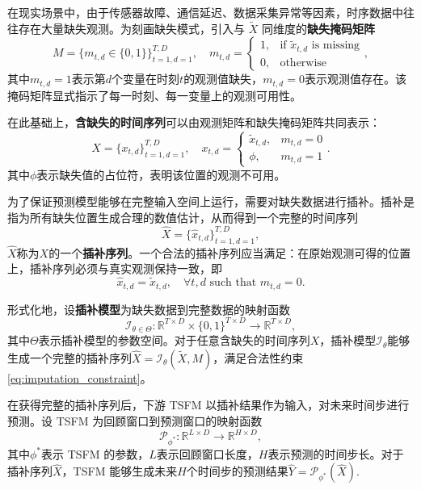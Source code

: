 \documentclass{article}
\begin{document}
在现实场景中，由于传感器故障、通信延迟、数据采集异常等因素，时序数据中往往存在大量缺失观测。为刻画缺失模式，引入与 $\tilde{X}$ 同维度的\textbf{缺失掩码矩阵}
\begin{equation}
	M =\{m_{t,d}\in\{0,1\}\}_{t=1,d=1}^{T,D},\quad m_{t,d} =\begin{cases}1, &\text{if }\tilde{x}_{t,d}\text{ is missing}\\0, &\text{otherwise}\end{cases},
\end{equation}
其中$m_{t,d}=1$表示第$d$个变量在时刻$t$的观测值缺失，$m_{t,d}=0$表示观测值存在。该掩码矩阵显式指示了每一时刻、每一变量上的观测可用性。

在此基础上，\textbf{含缺失的时间序列}可以由观测矩阵和缺失掩码矩阵共同表示：
\begin{equation}
	X =\{x_{t,d}\}_{t=1,d=1}^{T,D},\quad x_{t,d} =\begin{cases}\tilde{x}_{t,d}, & m_{t,d}=0\\\phi, & m_{t,d}=1\end{cases}.
\end{equation}
其中$\phi$表示缺失值的占位符，表明该位置的观测不可用。

为了保证预测模型能够在完整输入空间上运行，需要对缺失数据进行插补。插补是指为所有缺失位置生成合理的数值估计，从而得到一个完整的时间序列
\begin{equation}
	\hat{X} =\{\hat{x}_{t,d}\}_{t=1,d=1}^{T,D},
\end{equation}
$\hat{X}$称为$X$的一个\textbf{插补序列}。一个合法的插补序列应当满足：在原始观测可得的位置上，插补序列必须与真实观测保持一致，即
\begin{equation}\label{eq:imputation_constraint}
	\hat{x}_{t,d} =\tilde{x}_{t,d},\quad\forall t,d\text{ such that } m_{t,d}=0.
\end{equation}

形式化地，设\textbf{插补模型}为缺失数据到完整数据的映射函数
\begin{equation}
	\mathcal{I}_{\theta\in\Theta}:\mathbb{R}^{T\times D}\times\{0,1\}^{T\times D}\to\mathbb{R}^{T\times D},
\end{equation}
其中$\Theta$表示插补模型的参数空间。对于任意含缺失的时间序列$X$，插补模型$\mathcal{I}_\theta$能够生成一个完整的插补序列$\hat{X} =\mathcal{I}_\theta(\tilde{X}, M)$，满足合法性约束\ref{eq:imputation_constraint}。

在获得完整的插补序列后，下游 TSFM 以插补结果作为输入，对未来时间步进行预测。设 TSFM 为回顾窗口到预测窗口的映射函数
\begin{equation}
	\mathcal{P}_{\phi^\ast}:\mathbb{R}^{L\times D}\to\mathbb{R}^{H\times D},
\end{equation}
其中$\phi^\ast$表示 TSFM 的参数，$L$表示回顾窗口长度，$H$表示预测的时间步长。对于插补序列$\hat{X}$，TSFM 能够生成未来$H$个时间步的预测结果$\hat{Y} =\mathcal{P}_{\phi^\ast}(\hat{X}).$
\end{document}
